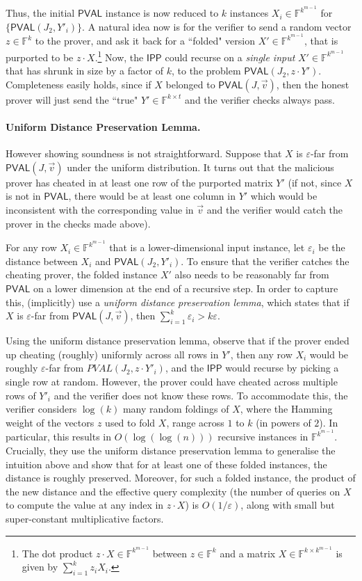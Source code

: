 \documentclass[10pt,a4paper]{article}
\newcommand{\PVAL}{\mathsf{PVAL}}
\newcommand{\IPP}{\mathsf{IPP}}
\newcommand{\F}{\mathbb{F}}
\begin{document}
Thus, the initial $\PVAL$ instance is now reduced to $k$ instances $X_i \in \F^{k^{m-1}}$ for $\{\PVAL(J_2,Y'_i)\}$. A natural idea now is for the verifier to send a random vector $z \in \F^k$ to the prover, and ask it back for a ``folded" version $X' \in \F^{k^{m-1}}$, that is purported to be $z \cdot X$.\footnote{The dot product $z \cdot X \in \F^{k^{m-1}}$ between $z \in \F^{k}$ and a matrix $X \in \F^{k \times k^{m-1}}$ is given by $\sum_{i=1}^k z_i X_i$.} Now, the $\IPP$ could recurse on a \textit{single input} $X' \in \F^{k^{m-1}}$ that has shrunk in size by a factor of $k$, to the problem $\PVAL(J_2, z \cdot Y')$. Completeness easily holds, since if $X$ belonged to $\PVAL(J,\Vec{v})$, then the honest prover will just send the ``true" $Y' \in \F^{k \times t}$ and the verifier checks always pass. 

\paragraph{Uniform Distance Preservation Lemma.} However showing soundness is not straightforward. Suppose that $X$ is $\varepsilon$-far from $\PVAL(J,\Vec{v})$ under the uniform distribution. It turns out that the malicious prover has cheated in at least one row of the purported matrix $Y'$ (if not, since $X$ is not in $\PVAL$, there would be at least one column in $Y'$ which would be inconsistent with the corresponding value in $\vec{v}$ and the verifier would catch the prover in the checks made above). 

For any row $X_i \in \F^{k^{m-1}}$ that is a lower-dimensional input instance, let $\varepsilon_i$ be the distance between $X_i$ and $\PVAL(J_2, Y'_i)$. To ensure that the verifier catches the cheating prover, the folded instance $X'$ also needs to be reasonably far from $\PVAL$ on a lower dimension at the end of a recursive step. In order to capture this, \cite{RVW} (implicitly) use a \textit{uniform distance preservation lemma}, which states that if $X$ is $\varepsilon$-far from $\PVAL(J,\Vec{v})$, then $\sum_{i=1}^k \varepsilon_i > k \varepsilon$. 

Using the uniform distance preservation lemma, \cite{RVW} observe that if the prover ended up cheating (roughly) uniformly across all rows in $Y'$, then any row $X_i$ would be roughly $\varepsilon$-far from $PVAL(J_2, z \cdot Y'_i)$, and the $\IPP$ would recurse by picking a single row at random. However, the prover could have cheated across multiple rows of $Y'_i$ and the verifier does not know these rows. To accommodate this, the verifier considers $\log(k)$ many random foldings of $X$, where the Hamming weight of the vectors $z$ used to fold $X$, range across $1$ to $k$ (in powers of $2$). In particular, this results in $O(\log (\log (n)))$ recursive instances in $\F^{k^{m-1}}$. Crucially, they use the uniform distance preservation lemma to generalise the intuition above and show that for at least one of these folded instances, the distance is roughly preserved. Moreover, for such a folded instance, the product of the new distance and the effective query complexity (the number of queries on $X$ to compute the value at any index in $z \cdot X$) is $O(1/\varepsilon)$, along with small but super-constant multiplicative factors.
\end{document}
